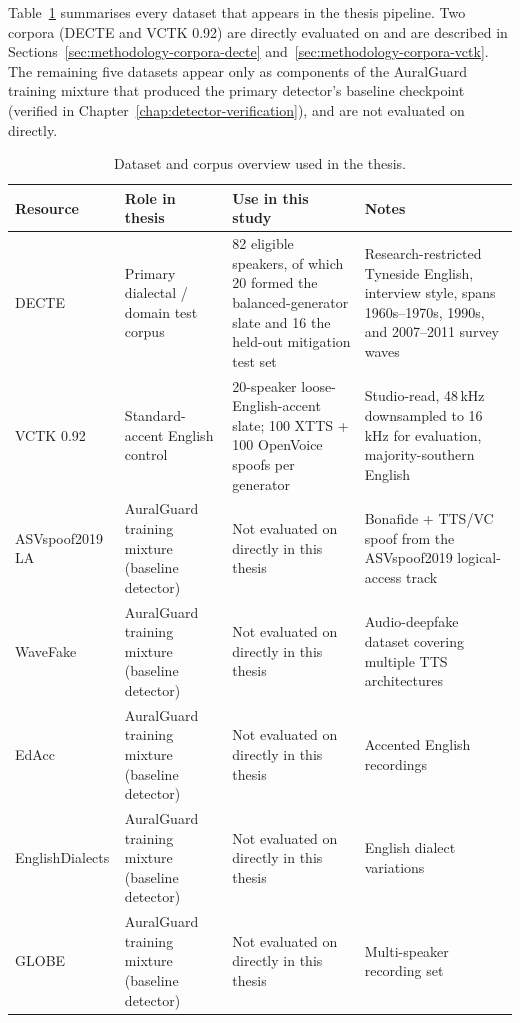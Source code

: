 Table~\ref{tab:dataset-corpus-overview} summarises every dataset that
appears in the thesis pipeline. Two corpora (DECTE and VCTK 0.92) are
directly evaluated on and are described in Sections~\ref{sec:methodology-corpora-decte}
and~\ref{sec:methodology-corpora-vctk}. The remaining five datasets
appear only as components of the AuralGuard training mixture that
produced the primary detector's baseline checkpoint (verified in
Chapter~\ref{chap:detector-verification}), and are not evaluated on
directly.

\begin{table}[t]
\centering
\caption{Dataset and corpus overview used in the thesis.}
\label{tab:dataset-corpus-overview}
\small
\setlength{\tabcolsep}{4pt}
\begin{tabularx}{\linewidth}{@{}l X X X@{}}
\toprule
\textbf{Resource} & \textbf{Role in thesis} & \textbf{Use in this study} & \textbf{Notes} \\
\midrule
DECTE            & Primary dialectal / domain test corpus & 82 eligible speakers, of which 20 formed the balanced-generator slate and 16 the held-out mitigation test set & Research-restricted Tyneside English, interview style, spans 1960s--1970s, 1990s, and 2007--2011 survey waves \\
VCTK 0.92        & Standard-accent English control        & 20-speaker loose-English-accent slate; 100 XTTS + 100 OpenVoice spoofs per generator & Studio-read, 48\,kHz downsampled to 16\,kHz for evaluation, majority-southern English \\
ASVspoof2019 LA  & AuralGuard training mixture (baseline detector) & Not evaluated on directly in this thesis & Bonafide + TTS/VC spoof from the ASVspoof2019 logical-access track \\
WaveFake         & AuralGuard training mixture (baseline detector) & Not evaluated on directly in this thesis & Audio-deepfake dataset covering multiple TTS architectures \\
EdAcc            & AuralGuard training mixture (baseline detector) & Not evaluated on directly in this thesis & Accented English recordings \\
EnglishDialects  & AuralGuard training mixture (baseline detector) & Not evaluated on directly in this thesis & English dialect variations \\
GLOBE            & AuralGuard training mixture (baseline detector) & Not evaluated on directly in this thesis & Multi-speaker recording set \\
\bottomrule
\end{tabularx}
\end{table}

